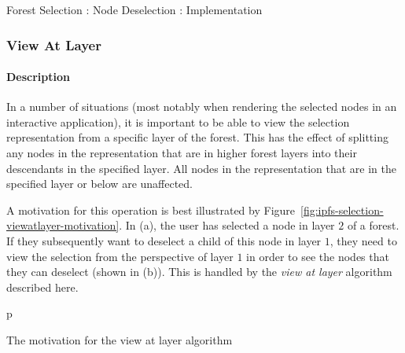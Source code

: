 \begin{stulisting}[p]
\caption{Forest Selection : Node Deselection : Implementation}
\label{code:ipfs-selection-deselectnodeimpl}

\end{stulisting}

\afterpage{\clearpage}
\newpage

\subsubsection{View At Layer}

\paragraph{Description}

In a number of situations (most notably when rendering the selected nodes in an interactive application), it is important to be able to view the selection representation from a specific layer of the forest. This has the effect of splitting any nodes in the representation that are in higher forest layers into their descendants in the specified layer. All nodes in the representation that are in the specified layer or below are unaffected.

A motivation for this operation is best illustrated by Figure~\ref{fig:ipfs-selection-viewatlayer-motivation}. In (a), the user has selected a node in layer $2$ of a forest. If they subsequently want to deselect a child of this node in layer $1$, they need to view the selection from the perspective of layer $1$ in order to see the nodes that they can deselect (shown in (b)). This is handled by the \emph{view at layer} algorithm described here.

\begin{stusubfig}{p}
	\hspace{4mm}%
\caption{The motivation for the view at layer algorithm}
\label{fig:ipfs-selection-viewatlayer-motivation}
\end{stusubfig}

